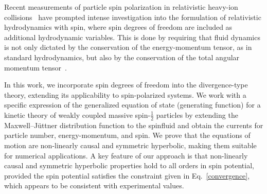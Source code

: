 \documentclass[12pt,aps,prd,nofootinbib,noshowkeys,noshowpacs,longbibliography,
superscriptaddress,tightenlines,floatfix,preprintnumbers]{revtex4-2}
\begin{document}
Recent measurements of particle spin polarization in relativistic heavy-ion collisions~\cite{STAR:2017ckg,STAR:2019erd,ALICE:2019onw,ALICE:2019aid,ALICE:2021pzu,STAR:2022fan} have prompted intense investigation into the formulation of relativistic hydrodynamics with spin, where spin degrees of freedom are included as additional hydrodynamic variables. This is done by requiring that fluid dynamics is not only dictated by the conservation of the energy-momentum tensor, as in standard hydrodynamics, but also by the conservation of the total angular momentum tensor~\cite{Jackiw:2004nm,Becattini:2011zz,Karabali:2014vla,Florkowski:2017ruc,Florkowski:2017dyn,Montenegro:2017rbu,Florkowski:2018fap,Hattori:2019lfp,Montenegro:2018bcf,Florkowski:2019qdp,Montenegro:2020paq,Gallegos:2020otk,Singh:2020rht,Bhadury:2020puc,Weickgenannt:2020aaf,Fukushima:2020ucl,Gallegos:2021bzp,Li:2020eon,Hu:2021pwh,Wang:2021ngp,Hongo:2021ona,Florkowski:2021wvk,Weickgenannt:2022zxs,Cao:2022aku,Cartwright:2021qpp,Gallegos:2022jow,Biswas:2023qsw,Weickgenannt:2023bss,Becattini:2023ouz,Ren:2024pur,Drogosz:2024gzv,Wagner:2024fhf,Chiarini:2024cuv,Wagner:2024fry,Singh:2024cub,Giacalone:2025bgm,Bhadury:2025fil,Sapna:2025yss,Singh:2025hnb, Ivanov:2025izv}.


In this work, we incorporate spin degrees of freedom into the divergence-type theory, extending its applicability to spin-polarized systems. {\color{black}We work with a specific expression of the generalized equation of state (generating function) for a kinetic theory of weakly coupled massive spin-$\frac{1}{2}$ particles by extending the Maxwell--Jüttner distribution function to the spinfluid and obtain the currents for particle number, energy-momentum, and spin.} We prove that the equations of motion are non-linearly causal and symmetric hyperbolic, making them suitable for numerical applications. A key feature of our approach is that non-linearly causal and symmetric hyperbolic properties hold to all orders in spin potential, provided the spin potential satisfies the constraint given in Eq.~\eqref{convergence}, which appears to be consistent with experimental values.
\end{document}
